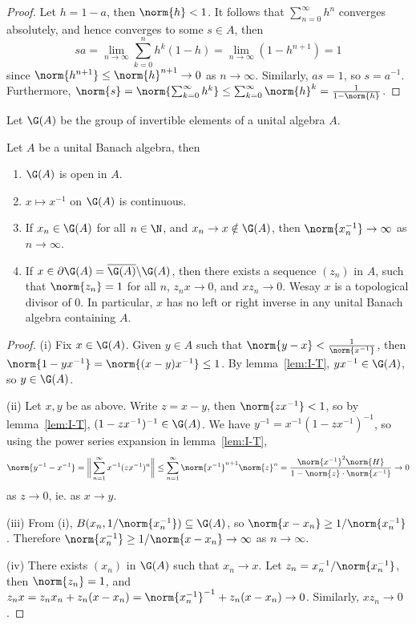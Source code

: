 \documentclass[a4paper]{article}
\begin{document}
\begin{proof}
  Let $h=1-a$, then $\norm{h}<1$. It follows that $\sum_{n=0}^\infty h^n$ converges absolutely, and hence converges to some $s\in A$, then
  \[
    sa=\lim_{n\to\infty}\sum_{k=0}^n h^k(1-h)=\lim_{n\to\infty}(1-h^{n+1})=1
  \]
  since $\norm{h^{n+1}}\leq\norm{h}^{n+1}\to 0$ as $n\to\infty$. Similarly, $as=1$, so $s=a^{-1}$. Furthermore, $\norm{s}=\norm{\sum_{k=0}^\infty h^k}\leq\sum_{k=0}^\infty\norm{h}^k=\frac{1}{1-\norm{h}}$.
\end{proof}

\noindent Let $\G(A)$ be the group of invertible elements of a unital algebra $A$.

\begin{ncor}\label{cor:G(X)}
	Let $A$ be a unital Banach algebra, then
	\begin{enumerate}[label=(\roman*)]
		\item $\G(A)$ is open in $A$.
		\item $x\mapsto x^{-1}$ on $\G(A)$ is continuous.
		\item If $x_n\in\G(A)$ for all $n\in\N$, and $x_n\to x\notin\G(A)$, then $\norm{x_n^{-1}}\to\infty$ as $n\to\infty$.
		\item If $x\in\partial\G(A)=\overline{\G(A)}\backslash\G(A)$, then there exists a sequence $(z_n)$ in $A$, such that $\norm{z_n}=1$ for all $n$, $z_n x\to 0$, and $x z_n\to 0$. Wesay $x$ is a topological divisor of 0. In particular, $x$ has no left or right inverse in any unital Banach algebra containing $A$.
	\end{enumerate}
\end{ncor}

\begin{proof}
	(i) Fix $x\in\G(A)$. Given $y\in A$ such that $\norm{y-x}<\frac{1}{\norm{x^{-1}}}$, then $\norm{1-yx^{-1}}=\norm{(x-y)x^{-1}}\leq 1$. By lemma~\ref{lem:I-T}, $yx^{-1}\in\G(A)$, so $y\in\G(A)$.

	(ii) Let $x,y$ be as above. Write $z=x-y$, then $\norm{zx^{-1}}<1$, so by lemma~\ref{lem:I-T}, $(1-zx^{-1})^{-1}\in\G(A)$. We have $y^{-1}=x^{-1}(1-zx^{-1})^{-1}$, so using the power series expansion in lemma~\ref{lem:I-T},
	\[\norm{y^{-1}-x^{-1}}=\bigg\|\sum_{n=1}^\infty x^{-1}(zx^{-1})^n\bigg\|\leq\sum_{n=1}^\infty\norm{x^{-1}}^{n+1}\norm{z}^n= \frac{\norm{x^{-1}}^2\norm{H}}{1-\norm{z}\cdot\norm{x^{-1}}}\to 0\]
	as $z\to 0$, ie. as $x\to y$.

	(iii) From (i), $B(x_n,1/\norm{x_n^{-1}})\subseteq\G(A)$, so $\norm{x-x_n}\geq 1/\norm{x_n^{-1}}$. Therefore $\norm{x_n^{-1}}\geq 1/\norm{x-x_n}\to\infty$ as $n\to\infty$.

	(iv) There exists $(x_n)$ in $\G(A)$ such that $x_n\to x$. Let $z_n=x_n^{-1}/\norm{x_n^{-1}}$, then $\norm{z_n}=1$, and $z_nx=z_nx_n+z_n(x-x_n)=\norm{x_n^{-1}}^{-1}+z_n(x-x_n)\to 0$. Similarly, $xz_n\to 0$.
\end{proof}
\end{document}
